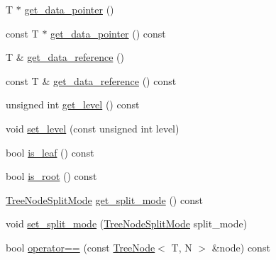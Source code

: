 \begin{DoxyCompactItemize}
\item 
T $\ast$ \hyperlink{classTreeNode_aaa2ba047902c4e2fccffe3424a0c665b}{get\+\_\+data\+\_\+pointer} ()
\item 
const T $\ast$ \hyperlink{classTreeNode_ac6894ba6488ee38978ef2476366f6318}{get\+\_\+data\+\_\+pointer} () const
\item 
T \& \hyperlink{classTreeNode_a7bf414928c965e707e0246f7a90a747d}{get\+\_\+data\+\_\+reference} ()
\item 
const T \& \hyperlink{classTreeNode_ab051909179e64f75d4588b4618049193}{get\+\_\+data\+\_\+reference} () const
\item 
unsigned int \hyperlink{classTreeNode_acdf29b3bf8f5f9c5e04baaa9fd71fb4c}{get\+\_\+level} () const
\item 
void \hyperlink{classTreeNode_a67e5762f796247c38f4a2560c1250b11}{set\+\_\+level} (const unsigned int level)
\item 
bool \hyperlink{classTreeNode_a64bf0bc987b1abe5ba10cdf32f093b58}{is\+\_\+leaf} () const
\item 
bool \hyperlink{classTreeNode_ad2eb3a4d2a8d9dad252ee721bab24655}{is\+\_\+root} () const
\item 
\hyperlink{tree_8h_a922ca07db9633957939f697a65aff11d}{Tree\+Node\+Split\+Mode} \hyperlink{classTreeNode_a219944254f78755b181cad0ee621835f}{get\+\_\+split\+\_\+mode} () const
\item 
void \hyperlink{classTreeNode_a0aec2b9142e931aaaa15d1c451ed9b46}{set\+\_\+split\+\_\+mode} (\hyperlink{tree_8h_a922ca07db9633957939f697a65aff11d}{Tree\+Node\+Split\+Mode} split\+\_\+mode)
\item 
bool \hyperlink{classTreeNode_a9446085d81c4266ca30a384001f55b12}{operator==} (const \hyperlink{classTreeNode}{Tree\+Node}$<$ T, N $>$ \&node) const
\end{DoxyCompactItemize}

